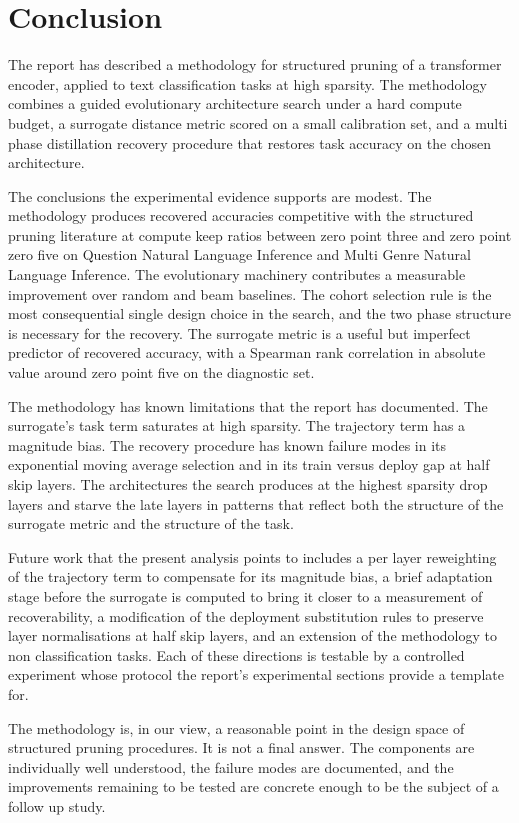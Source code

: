 \section{Conclusion}
\label{chap:conclusion}

The report has described a methodology for structured pruning of a transformer encoder, applied to text classification tasks at high sparsity. The methodology combines a guided evolutionary architecture search under a hard compute budget, a surrogate distance metric scored on a small calibration set, and a multi phase distillation recovery procedure that restores task accuracy on the chosen architecture.

The conclusions the experimental evidence supports are modest. The methodology produces recovered accuracies competitive with the structured pruning literature at compute keep ratios between zero point three and zero point zero five on Question Natural Language Inference and Multi Genre Natural Language Inference. The evolutionary machinery contributes a measurable improvement over random and beam baselines. The cohort selection rule is the most consequential single design choice in the search, and the two phase structure is necessary for the recovery. The surrogate metric is a useful but imperfect predictor of recovered accuracy, with a Spearman rank correlation in absolute value around zero point five on the diagnostic set.

The methodology has known limitations that the report has documented. The surrogate's task term saturates at high sparsity. The trajectory term has a magnitude bias. The recovery procedure has known failure modes in its exponential moving average selection and in its train versus deploy gap at half skip layers. The architectures the search produces at the highest sparsity drop layers and starve the late layers in patterns that reflect both the structure of the surrogate metric and the structure of the task.

Future work that the present analysis points to includes a per layer reweighting of the trajectory term to compensate for its magnitude bias, a brief adaptation stage before the surrogate is computed to bring it closer to a measurement of recoverability, a modification of the deployment substitution rules to preserve layer normalisations at half skip layers, and an extension of the methodology to non classification tasks. Each of these directions is testable by a controlled experiment whose protocol the report's experimental sections provide a template for.

The methodology is, in our view, a reasonable point in the design space of structured pruning procedures. It is not a final answer. The components are individually well understood, the failure modes are documented, and the improvements remaining to be tested are concrete enough to be the subject of a follow up study.

